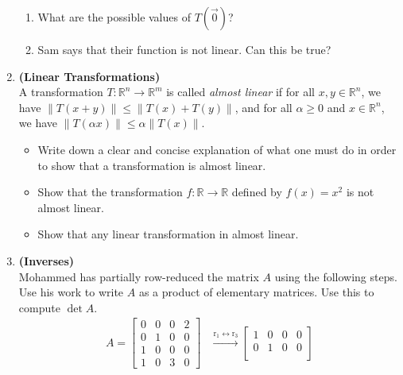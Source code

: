 \documentclass[red]{tutorial}
\newcommand{\R}{\mathbb{R}}
\theoremstyle{definition}
\theoremstyle{theorem}
\begin{document}
\begin{tutorial}
\begin{enumerate}
{\begin{center}
      \end{center}
      \begin{enumerate}
        \item What are the possible values of $T(\vec0)$?
        \item Sam says that their function is not linear. Can this be true?
      \end{enumerate}
      }
    \item \textbf{(Linear Transformations)}\\
      A transformation $T:\R^n\to \R^m$ is called 
      \textit{almost linear} if for all $x,y\in \R^n$, we have 
      $\|T(x+y)\| \le \|T(x)+T(y)\|$, and for all 
      $\alpha\ge 0$ and $x\in \R^n$, we have 
      $\|T(\alpha x)\|\le \alpha \|T(x)\|$.
      \begin{itemize}
        \item Write down a clear and concise explanation of what 
          one must do in order to show that a transformation is 
          almost linear.
        \item Show that the transformation $f:\R\to\R$ defined 
          by $f(x) = x^2$ is not almost linear.
        \item Show that any linear transformation in almost linear.
      \end{itemize}
    \item \textbf{(Inverses)}\\
      \newcommand{\pmin}{\phantom{-}}
      \newcommand{\row}[1]{\mathrm{r}_{#1}}
      Mohammed has partially row-reduced the matrix $A$ using the
      following steps. Use his work to write $A$ as a product of elementary
      matrices. Use this to compute $\det A$.
      \begin{align*}
        A = \begin{bmatrix}
          0 & 0 & 0 & 2 \\
          0 & 1 & 0 & 0 \\
          1 & 0 & 0 & 0 \\
          1 & 0 & 3 & 0
        \end{bmatrix}&\xrightarrow{\row{1} \leftrightarrow \row{3}}
        \begin{bmatrix}
          1 & 0 & 0 & 0 \\
          0 & 1 & 0 & 0 \\

\end{bmatrix}
\end{align*}
\end{enumerate}
\end{tutorial}
\end{document}
